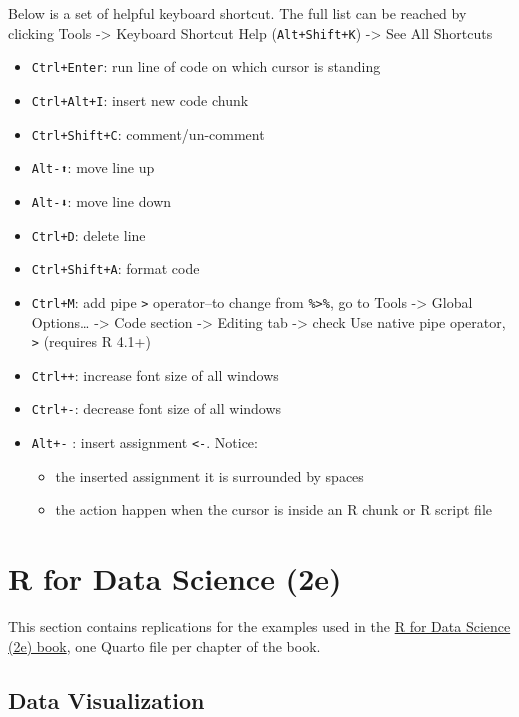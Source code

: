 \documentclass[
  letterpaper,
  DIV=11,
  numbers=noendperiod]{scrreprt}
\providecommand{\tightlist}{%
  \setlength{\itemsep}{0pt}\setlength{\parskip}{0pt}}\usepackage{longtable,booktabs,array}
\begin{document}
Below is a set of helpful keyboard shortcut. The full list can be
reached by clicking Tools -\textgreater{} Keyboard Shortcut Help
(\texttt{Alt+Shift+K}) -\textgreater{} See All Shortcuts

\begin{itemize}
\tightlist
\item
  \texttt{Ctrl+Enter}: run line of code on which cursor is standing
\item
  \texttt{Ctrl+Alt+I}: insert new code chunk
\item
  \texttt{Ctrl+Shift+C}: comment/un-comment
\item
  \texttt{Alt-⬆️}: move line up
\item
  \texttt{Alt-⬇️️}: move line down
\item
  \texttt{Ctrl+D}: delete line
\item
  \texttt{Ctrl+Shift+A}: format code
\item
  \texttt{Ctrl+M}: add pipe \texttt{\textbar{}\textgreater{}}
  operator--to change from \texttt{\%\textgreater{}\%}, go to Tools
  -\textgreater{} Global Options\ldots{} -\textgreater{} Code section
  -\textgreater{} Editing tab -\textgreater{} check Use native pipe
  operator, \texttt{\textbar{}\textgreater{}} (requires R 4.1+)
\item
  \texttt{Ctrl++}: increase font size of all windows
\item
  \texttt{Ctrl+-}: decrease font size of all windows
\item
  \texttt{Alt+-} : insert assignment \texttt{\textless{}-}. Notice:

  \begin{itemize}
  \tightlist
  \item
    the inserted assignment it is surrounded by spaces
  \item
    the action happen when the cursor is inside an R chunk or R script
    file
  \end{itemize}
\end{itemize}

\part{R for Data Science (2e)}

This section contains replications for the examples used in the
\href{https://r4ds.hadley.nz/}{R for Data Science (2e) book}, one Quarto
file per chapter of the book.

\chapter{Data Visualization}\label{data-visualization}
\end{document}
